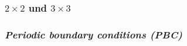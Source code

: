 \documentclass{beamer}
\begin{document}
\begin{frame}
	\frametitle{$2\times2$ und $3\times3$}
	\begin{figure}[h]
		\begin{center}
			
		\end{center}
	\end{figure}
\end{frame}

\begin{frame}
	\frametitle{\textit{Periodic boundary conditions (PBC)}}
	\begin{figure}[h]
		\begin{center}
			
		\end{center}
	\end{figure}
\end{frame}
\end{document}
